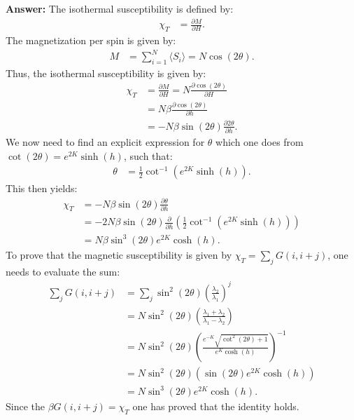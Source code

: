\documentclass[a4paper]{article}
\newcommand{\newparagraph}{\vspace{.5cm}\noindent}
\newcommand{\fpartial}[2]{\frac{\partial #1}{\partial #2}}
\newcommand{\average}[1]{\langle #1 \rangle}
\begin{document}
\newparagraph
\textbf{Answer:} The isothermal susceptibility is defined by:
\begin{align*}
    \chi_T &= \fpartial{M}{H}.
\end{align*}The magnetization per spin is given by:
\begin{align*}
    M &= \sum_{i = 1}^N\average{S_i} = N\cos(2\theta).
\end{align*}Thus, the isothermal susceptibility is given by:
\begin{align*}
    \chi_T &= \fpartial{M}{H} = N\fpartial{\cos(2\theta)}{H}\\
    &= N\beta\fpartial{\cos(2\theta)}{h}\\
    &= -N\beta\sin(2\theta)\fpartial{2\theta}{h}.
\end{align*}We now need to find an explicit expression for $\theta$ which one does from $\cot(2\theta) = e^{2K}\sinh(h)$, such that:
\begin{align*}
    \theta &= \frac{1}{2}\cot^{-1}\left(e^{2K}\sinh(h)\right).
\end{align*}This then yields:
\begin{align*}
    \chi_T &=-N\beta\sin(2\theta)\fpartial{\theta}{h}\\
    &= -2N\beta\sin\left(2\theta\right)\fpartial{}{h}\left(\frac{1}{2}\cot^{-1}\left(e^{2K}\sinh(h)\right)\right)\\
    &= N\beta\sin^3\left(2\theta\right)e^{2K}\cosh(h).
\end{align*}
To prove that the magnetic susceptibility is given by $\chi_T = \sum_j G(i, i+j)$, one needs to evaluate the sum:
\begin{align*}
    \sum_j G(i, i+j) &= \sum_j \sin^2\left(2\theta\right)\left(\frac{\lambda_2}{\lambda_1}\right)^j\\
    &= N\sin^2\left(2\theta\right)\left(\frac{\lambda_1 + \lambda_2}{\lambda_1 - \lambda_2}\right)\\
    &= N\sin^2\left(2\theta\right)\left(\frac{e^{-K}\sqrt{\cot^2(2\theta) + 1}}{e^{K}\cosh(h)}\right)^{-1}\\
    &= N\sin^2\left(2\theta\right)\left(\sin(2\theta)e^{2K}\cosh(h)\right)\\
    &= N\sin^3\left(2\theta\right)e^{2K}\cosh(h).
\end{align*}Since the $\beta G(i, i+j) = \chi_T$ one has proved that the identity holds.
\end{document}
